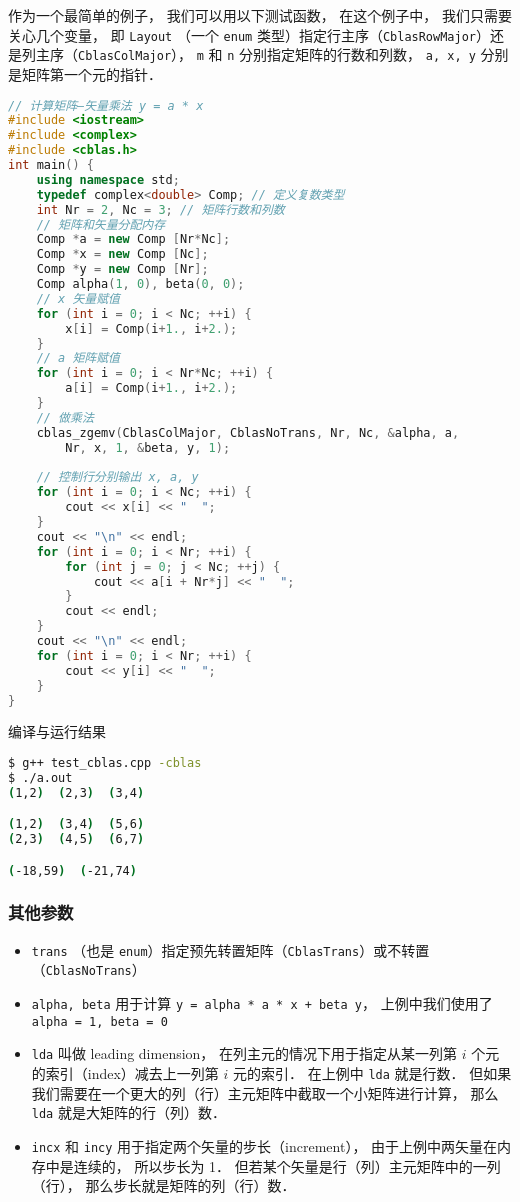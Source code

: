 作为一个最简单的例子， 我们可以用以下测试函数， 在这个例子中， 我们只需要关心几个变量， 即 \verb|Layout| （一个 \verb|enum| 类型）指定行主序（\verb|CblasRowMajor|）还是列主序（\verb|CblasColMajor|）， \verb|m| 和 \verb|n| 分别指定矩阵的行数和列数， \verb|a, x, y| 分别是矩阵第一个元的指针．
\begin{lstlisting}[language=cpp, caption=blas\_demo.cpp]
// 计算矩阵—矢量乘法 y = a * x
#include <iostream>
#include <complex>
#include <cblas.h>
int main() {
    using namespace std;
    typedef complex<double> Comp; // 定义复数类型
    int Nr = 2, Nc = 3; // 矩阵行数和列数
    // 矩阵和矢量分配内存
    Comp *a = new Comp [Nr*Nc];
    Comp *x = new Comp [Nc];
    Comp *y = new Comp [Nr];
    Comp alpha(1, 0), beta(0, 0);
    // x 矢量赋值
    for (int i = 0; i < Nc; ++i) {
        x[i] = Comp(i+1., i+2.);
    }
    // a 矩阵赋值
    for (int i = 0; i < Nr*Nc; ++i) {
        a[i] = Comp(i+1., i+2.);
    }
    // 做乘法
    cblas_zgemv(CblasColMajor, CblasNoTrans, Nr, Nc, &alpha, a,
        Nr, x, 1, &beta, y, 1);
        
    // 控制行分别输出 x, a, y
    for (int i = 0; i < Nc; ++i) {
        cout << x[i] << "  ";
    }
    cout << "\n" << endl;
    for (int i = 0; i < Nr; ++i) {
        for (int j = 0; j < Nc; ++j) {
            cout << a[i + Nr*j] << "  ";
        }
        cout << endl;
    }
    cout << "\n" << endl;
    for (int i = 0; i < Nr; ++i) {
        cout << y[i] << "  ";
    }
}
\end{lstlisting}

编译与运行结果
\begin{lstlisting}[language=bash]
$ g++ test_cblas.cpp -cblas
$ ./a.out
(1,2)  (2,3)  (3,4)

(1,2)  (3,4)  (5,6)
(2,3)  (4,5)  (6,7)

(-18,59)  (-21,74)
\end{lstlisting}

\subsubsection{其他参数}
\begin{itemize}
\item \verb|trans| （也是 \verb|enum|）指定预先转置矩阵（\verb|CblasTrans|）或不转置（\verb|CblasNoTrans|）
\item \verb|alpha, beta| 用于计算 \verb|y = alpha * a * x + beta y|， 上例中我们使用了 \verb|alpha = 1, beta = 0|
\item \verb|lda| 叫做 leading dimension， 在列主元的情况下用于指定从某一列第 $i$ 个元的索引（index）减去上一列第 $i$ 元的索引． 在上例中 \verb|lda| 就是行数． 但如果我们需要在一个更大的列（行）主元矩阵中截取一个小矩阵进行计算， 那么 \verb|lda| 就是大矩阵的行（列）数．
\item \verb|incx| 和 \verb|incy| 用于指定两个矢量的步长（increment）， 由于上例中两矢量在内存中是连续的， 所以步长为 1． 但若某个矢量是行（列）主元矩阵中的一列（行）， 那么步长就是矩阵的列（行）数．
\end{itemize}

